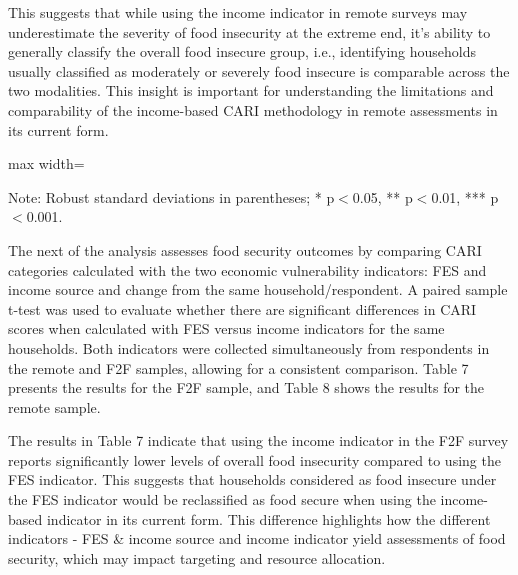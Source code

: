 \documentclass[11pt,harvard]{article}
\begin{document}
	This suggests that while using the income indicator in remote surveys may underestimate the severity of food insecurity at the extreme end, it's ability to generally classify the overall food insecure group, i.e., identifying households usually classified as moderately or severely food insecure is comparable across the two modalities. This insight is important for understanding the limitations and comparability of the income-based CARI methodology in remote assessments in its current form.
	
	\begin{table}[htbp]
		\centering
		\begin{adjustbox}{max width=\textwidth}
			\begin{threeparttable}
				\caption{Impact of Survey Modality: CARI-Inc vs. rCARI-Inc}
				\scriptsize
				 
				\label{tab:Inc_CARI_rCARI_Modality_BF}
				\begin{tablenotes}
					\item Note: Robust standard deviations in parentheses; * p$<$0.05, ** p$<$0.01, *** p$<$0.001. 
				\end{tablenotes}
			\end{threeparttable}
		\end{adjustbox}
	\end{table}
	
	The next of the analysis assesses food security outcomes by comparing CARI categories calculated with the two economic vulnerability indicators: FES and income source and change from the same household/respondent. A paired sample t-test was used to evaluate whether there are significant differences in CARI scores when calculated with FES versus income indicators for the same households. Both indicators were collected simultaneously from respondents in the remote and F2F samples, allowing for a consistent comparison. Table 7 presents the results for the F2F sample, and Table 8 shows the results for the remote sample.
	
	The results in Table 7 indicate that using the income indicator in the F2F survey reports significantly lower levels of overall food insecurity compared to using the FES indicator. This suggests that households considered as food insecure under the FES indicator would be reclassified as food secure when using the income-based indicator in its current form. This difference highlights how the different indicators - FES \& income source and income indicator  yield assessments of food security, which may impact targeting and resource allocation.
	
\end{document}
